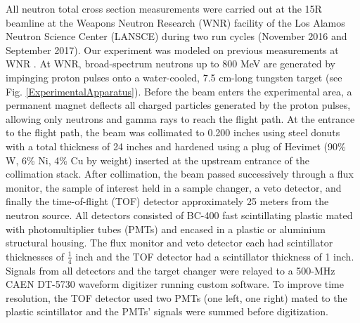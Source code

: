 All neutron total cross section measurements were carried out at the 15R
beamline at the Weapons Neutron Research (WNR) facility of the Los Alamos
Neutron Science Center (LANSCE) during two run cycles (November 2016 and
September 2017). Our experiment was modeled on previous
\tots measurements at WNR \cite{Finlay1993,Abfalterer2001,Shane2010}. At WNR,
broad-spectrum neutrons up
to 800 MeV are generated by impinging proton pulses onto a water-cooled, 7.5
cm-long tungsten target (see Fig. \ref{ExperimentalApparatus}). Before the beam
enters the experimental area, a
permanent magnet deflects all charged particles generated by the proton pulses, 
allowing only neutrons and gamma rays to reach the flight path. At the
entrance to the flight path, the beam was collimated to 0.200 inches using steel
donuts with a total thickness of 24 inches and hardened using a plug of Hevimet (90\% W, 6\% 
Ni, 4\% Cu by weight) inserted at the upstream entrance of the
collimation stack. After collimation, the beam passed successively through a flux 
monitor, the sample of interest held in a sample changer, a veto detector, and finally the 
time-of-flight (TOF) detector approximately 25 meters from the neutron source.
All detectors consisted of BC-400 fast scintillating plastic mated with 
photomultiplier tubes (PMTs) and encased in a plastic or
aluminium structural housing. The flux monitor and veto detector each had
scintillator thicknesses of $\frac{1}{4}$ inch and the TOF detector had a
scintillator thickness of 1 inch. Signals from all detectors and
the target changer were relayed to a 500-MHz CAEN DT-5730 waveform digitizer
running custom software. To improve time resolution, the TOF detector used two
PMTs (one left, one right) mated to the plastic scintillator and the PMTs' signals were 
summed before digitization.

